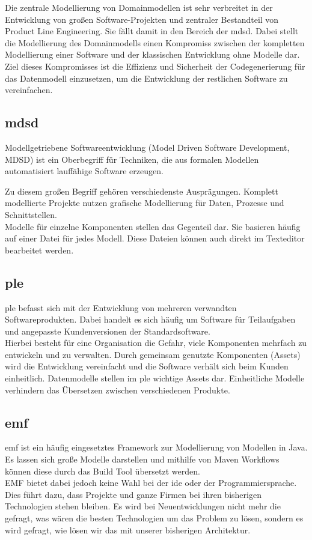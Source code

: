 \documentclass[./einleitung.tex]{subfiles}
\begin{document}
Die zentrale Modellierung von Domainmodellen ist sehr verbreitet in der Entwicklung von großen Software-Projekten und zentraler Bestandteil von Product Line Engineering.
Sie fällt damit in den Bereich der \acrfull{mdsd}.
Dabei stellt die Modellierung des Domainmodells einen Kompromiss zwischen der kompletten Modellierung einer Software und der klassischen Entwicklung ohne Modelle dar. \\
Ziel dieses Kompromisses ist die Effizienz und Sicherheit der Codegenerierung für das Datenmodell einzusetzen, um die Entwicklung der restlichen Software zu vereinfachen.

\subsection{\acrfull{mdsd}}\label{subsec:mdsd}
\begin{center}
    Modellgetriebene Softwareentwicklung (Model Driven Software Development, MDSD) ist ein Oberbegriff für Techniken, die aus formalen Modellen automatisiert lauffähige Software erzeugen. \cite[p. 11]{modellbuch}
\end{center}
Zu diesem großen Begriff gehören verschiedenste Ausprägungen.
Komplett modellierte Projekte nutzen grafische Modellierung für Daten, Prozesse und Schnittstellen.\\
Modelle für einzelne Komponenten stellen das Gegenteil dar.
Sie basieren häufig auf einer Datei für jedes Modell.
Diese Dateien können auch direkt im Texteditor bearbeitet werden.
\subsection{\acrfull{ple}}\label{subsec:ple}
\acrshort{ple} befasst sich mit der Entwicklung von mehreren verwandten Softwareprodukten.
Dabei handelt es sich häufig um Software für Teilaufgaben und angepasste Kundenversionen der Standardsoftware. \\
Hierbei besteht für eine Organisation die Gefahr, viele Komponenten mehrfach zu entwickeln und zu verwalten.
Durch gemeinsam genutzte Komponenten (Assets) wird die Entwicklung vereinfacht und die Software verhält sich beim Kunden einheitlich.
Datenmodelle stellen im \acrshort{ple} wichtige Assets dar.
Einheitliche Modelle verhindern das Übersetzen zwischen verschiedenen Produkte.


\subsection{\acrshort{emf}}\label{subsec:emf}
\acrfull{emf} ist ein häufig eingesetztes Framework zur Modellierung von Modellen in Java.
Es lassen sich große Modelle darstellen und mithilfe von Maven Workflows können diese durch das Build Tool übersetzt werden. \\
EMF bietet dabei jedoch keine Wahl bei der \acrshort{ide} oder der Programmiersprache.
Dies führt dazu, dass Projekte und ganze Firmen bei ihren bisherigen Technologien stehen bleiben.
Es wird bei Neuentwicklungen nicht mehr die gefragt, was wären die besten Technologien um das Problem zu lösen, sondern es wird gefragt, wie lösen wir das mit unserer bisherigen Architektur.
\end{document}
